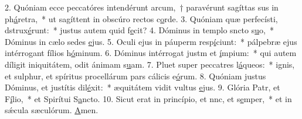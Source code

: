 2. Quóniam ecce peccatóres intendérunt arcum,~† paravérunt sagíttas sus in ph\uline{á}retra,~* ut sagíttent in obscúro rectos c\uline{o}rde.
3. Quóniam quæ perfecísti, dstrux\uline{é}runt:~* justus autem quid f\uline{e}cit?
4. Dóminus in templo sncto s\uline{u}o,~* Dóminus in cælo sedes \uline{e}jus.
5. Oculi ejus in páuperm resp\uline{í}ciunt:~* pálpebræ ejus intérrogant fílios h\uline{ó}minum.
6. Dóminus intérrogat justm et \uline{í}mpium:~* qui autem díligit iniquitátem, odit ánimam s\uline{u}am.
7. Pluet super peccatres l\uline{á}queos:~* ignis, et sulphur, et spíritus procellárum pars cálicis e\uline{ó}rum.
8. Quóniam justus Dóminus, et justítis dil\uline{é}xit:~* æquitátem vidit vultus \uline{e}jus.
9. Glória Patr, et F\uline{í}lio,~* et Spirítui S\uline{a}ncto.
10. Sicut erat in princípio, et nnc, et s\uline{e}mper,~* et in sǽcula sæculórum. \uline{A}men.
